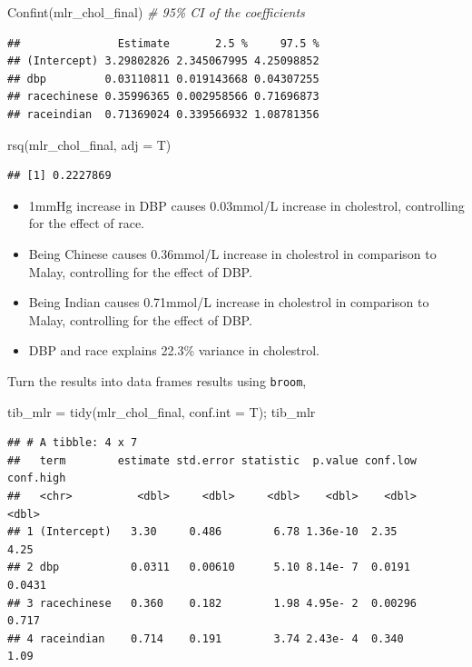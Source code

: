 \documentclass[
]{book}
\makeatletter
\newenvironment{Shaded}{\begin{snugshade}}{\end{snugshade}}
\newcommand{\AttributeTok}[1]{\textcolor[rgb]{0.61,0.61,0.61}{#1}}
\newcommand{\CommentTok}[1]{\textcolor[rgb]{0.37,0.37,0.37}{\textit{#1}}}
\newcommand{\FunctionTok}[1]{\textcolor[rgb]{0,0,0}{#1}}
\newcommand{\NormalTok}[1]{#1}
\newcommand{\OtherTok}[1]{\textcolor[rgb]{0.37,0.37,0.37}{#1}}
\providecommand{\tightlist}{%
  \setlength{\itemsep}{0pt}\setlength{\parskip}{0pt}}
\newenvironment{kframe}{%
\medskip{}
\setlength{\fboxsep}{.8em}
 \def\at@end@of@kframe{}%
 \ifinner\ifhmode%
  \def\at@end@of@kframe{\end{minipage}}%
  \begin{minipage}{\columnwidth}%
 \fi\fi%
 \def\FrameCommand##1{\hskip\@totalleftmargin \hskip-\fboxsep
 \colorbox{shadecolor}{##1}\hskip-\fboxsep
     \hskip-\linewidth \hskip-\@totalleftmargin \hskip\columnwidth}%
 \MakeFramed {\advance\hsize-\width
   \@totalleftmargin\z@ \linewidth\hsize
   \@setminipage}}%
 {\par\unskip\endMakeFramed%
 \at@end@of@kframe}
\renewenvironment{Shaded}{\begin{kframe}}{\end{kframe}}
\makeatother
\begin{document}
\begin{Shaded}
\begin{Highlighting}[]
\FunctionTok{Confint}\NormalTok{(mlr\_chol\_final)  }\CommentTok{\# 95\% CI of the coefficients}
\end{Highlighting}
\end{Shaded}

\begin{verbatim}
##               Estimate       2.5 %     97.5 %
## (Intercept) 3.29802826 2.345067995 4.25098852
## dbp         0.03110811 0.019143668 0.04307255
## racechinese 0.35996365 0.002958566 0.71696873
## raceindian  0.71369024 0.339566932 1.08781356
\end{verbatim}

\begin{Shaded}
\begin{Highlighting}[]
\FunctionTok{rsq}\NormalTok{(mlr\_chol\_final, }\AttributeTok{adj =}\NormalTok{ T)}
\end{Highlighting}
\end{Shaded}

\begin{verbatim}
## [1] 0.2227869
\end{verbatim}

\begin{itemize}
\tightlist
\item
  1mmHg increase in DBP causes 0.03mmol/L increase in cholestrol, controlling for the effect of race.
\item
  Being Chinese causes 0.36mmol/L increase in cholestrol in comparison to Malay, controlling for the effect of DBP.
\item
  Being Indian causes 0.71mmol/L increase in cholestrol in comparison to Malay, controlling for the effect of DBP.
\item
  DBP and race explains 22.3\% variance in cholestrol.
\end{itemize}

Turn the results into data frames results using \texttt{broom},

\begin{Shaded}
\begin{Highlighting}[]
\NormalTok{tib\_mlr }\OtherTok{=} \FunctionTok{tidy}\NormalTok{(mlr\_chol\_final, }\AttributeTok{conf.int =}\NormalTok{ T); tib\_mlr}
\end{Highlighting}
\end{Shaded}

\begin{verbatim}
## # A tibble: 4 x 7
##   term        estimate std.error statistic  p.value conf.low conf.high
##   <chr>          <dbl>     <dbl>     <dbl>    <dbl>    <dbl>     <dbl>
## 1 (Intercept)   3.30     0.486        6.78 1.36e-10  2.35       4.25  
## 2 dbp           0.0311   0.00610      5.10 8.14e- 7  0.0191     0.0431
## 3 racechinese   0.360    0.182        1.98 4.95e- 2  0.00296    0.717 
## 4 raceindian    0.714    0.191        3.74 2.43e- 4  0.340      1.09
\end{verbatim}
\end{document}
